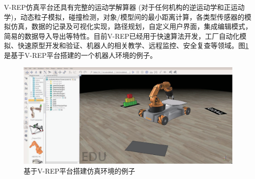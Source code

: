 V-REP仿真平台还具有完整的运动学解算器 (对于任何机构的逆运动学和正运动学)，动态粒子模拟，碰撞检测，对象/模型间的最小距离计算，各类型传感器的模拟仿真，数据的记录及可视化实现，路径规划，自定义用户界面，集成编辑模式，简易的数据导入导出等特性。目前V-REP已经用于快速算法开发，工厂自动化模拟、快速原型开发和验证、机器人的相关教学、远程监控、安全复查等领域。图\ref{fig:V-REP}是基于V-REP平台搭建的一个机器人环境的例子。

\begin{figure}[htbp]
	\centering
	\includegraphics[width=0.9\linewidth]{figure/chap03/VREP.eps}
	\caption{基于V-REP平台搭建仿真环境的例子}
	\label{fig:V-REP}
\end{figure}


